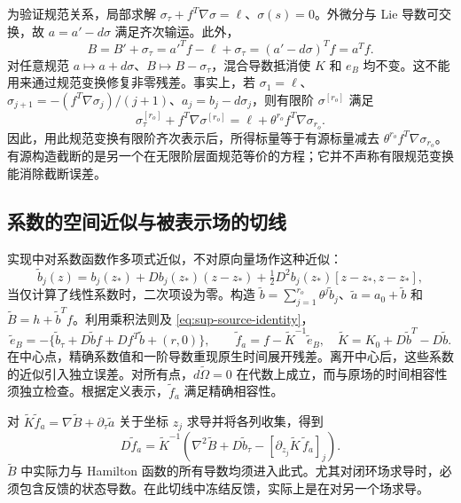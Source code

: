 为验证规范关系，局部求解 $\sigma_\tau+f^T\nabla\sigma=\ell$、$\sigma(s)=0$。外微分与 Lie 导数可交换，故 $a=a'-d\sigma$ 满足齐次输运。此外，
\begin{equation}
 B=B'+\sigma_\tau=a'^Tf-\ell+\sigma_\tau
   =(a'-d\sigma)^Tf=a^Tf.
 \label{eq:sup-gauge-equivalence}
\end{equation}
对任意规范 $a\mapsto a+d\sigma$、$B\mapsto B-\sigma_\tau$，混合导数抵消使 $K$ 和 $e_B$ 均不变。这不能用来通过规范变换修复非零残差。事实上，若 $\sigma_1=\ell$、$\sigma_{j+1}=-(f^T\nabla\sigma_j)/(j+1)$、$a_j=b_j-d\sigma_j$，则有限阶 $\sigma^{[r_o]}$ 满足
\begin{equation}
 \sigma^{[r_o]}_\tau+f^T\nabla\sigma^{[r_o]}
 =\ell+\theta^{r_o}f^T\nabla\sigma_{r_o}.
 \label{eq:sup-gauge-last-term}
\end{equation}
因此，用此规范变换有限阶齐次表示后，所得标量等于有源标量减去 $\theta^{r_o}f^T\nabla\sigma_{r_o}$。有源构造截断的是另一个在无限阶层面规范等价的方程；它并不声称有限规范变换能消除截断误差。

\subsection{系数的空间近似与被表示场的切线}
实现中对系数函数作多项式近似，不对原向量场作这种近似：
\begin{equation}
 \widetilde b_j(z)=b_j(z_*)+Db_j(z_*)(z-z_*)
       +\tfrac12D^2b_j(z_*)[z-z_*,z-z_*],
 \label{eq:sup-cache}
\end{equation}
当仅计算了线性系数时，二次项设为零。构造 $\widetilde b=\sum_{j=1}^{r_o}\theta^j\widetilde b_j$、$\widetilde a=a_0+\widetilde b$ 和 $\widetilde B=h+\widetilde b^Tf$。利用乘积法则及 \eqref{eq:sup-source-identity}，
\begin{equation}
 \widetilde e_B=-\{\widetilde b_\tau+D\widetilde b f+Df^T\widetilde b+(r,0)\},\qquad
 \widetilde f_a=f-\widetilde K^{-1}\widetilde e_B,
 \quad\widetilde K=K_0+D\widetilde b^T-D\widetilde b.
 \label{eq:sup-cache-field}
\end{equation}
在中心点，精确系数值和一阶导数重现原生时间展开残差。离开中心后，这些系数的近似引入独立误差。对所有点，$d\widetilde\Omega=0$ 在代数上成立，而与原场的时间相容性须独立检查。根据定义表示，$\widetilde f_a$ 满足精确相容性。

对 $\widetilde K\widetilde f_a=\nabla\widetilde B+\partial_\tau\widetilde a$ 关于坐标 $z_j$ 求导并将各列收集，得到
\begin{equation}
 D\widetilde f_a=\widetilde K^{-1}
 \left(\nabla^2\widetilde B+D\widetilde b_\tau
       -[\partial_{z_j}\widetilde K\,\widetilde f_a]_j\right).
 \label{eq:sup-represented-tangent}
\end{equation}
$\widetilde B$ 中实际力与 Hamilton 函数的所有导数均须进入此式。尤其对闭环场求导时，必须包含反馈的状态导数。在此切线中冻结反馈，实际上是在对另一个场求导。

